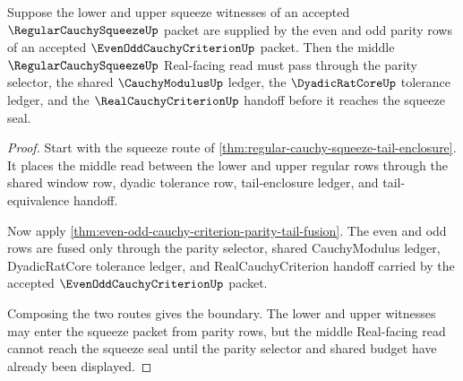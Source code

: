 \begin{theorem}
\label{thm:regular-cauchy-squeeze-even-odd-boundary}
Suppose the lower and upper squeeze witnesses of an accepted $\RegularCauchySqueezeUp$ packet are supplied by the even and odd parity rows of an accepted $\EvenOddCauchyCriterionUp$ packet. Then the middle $\RegularCauchySqueezeUp$ Real-facing read must pass through the parity selector, the shared $\CauchyModulusUp$ ledger, the $\DyadicRatCoreUp$ tolerance ledger, and the $\RealCauchyCriterionUp$ handoff before it reaches the squeeze seal.
\end{theorem}
\begin{proof}
Start with the squeeze route of \autoref{thm:regular-cauchy-squeeze-tail-enclosure}. It places the middle read between the lower and upper regular rows through the shared window row, dyadic tolerance row, tail-enclosure ledger, and tail-equivalence handoff.

Now apply \autoref{thm:even-odd-cauchy-criterion-parity-tail-fusion}. The even and odd rows are fused only through the parity selector, shared CauchyModulus ledger, DyadicRatCore tolerance ledger, and RealCauchyCriterion handoff carried by the accepted $\EvenOddCauchyCriterionUp$ packet.

Composing the two routes gives the boundary. The lower and upper witnesses may enter the squeeze packet from parity rows, but the middle Real-facing read cannot reach the squeeze seal until the parity selector and shared budget have already been displayed.
\end{proof}




